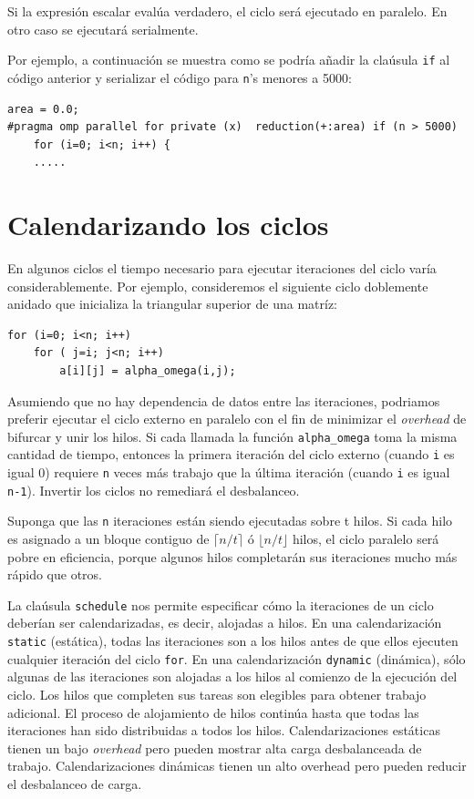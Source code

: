 \documentclass[12pt,letterpaper]{book}
\begin{document}
Si la expresión escalar evalúa verdadero, el ciclo será ejecutado en paralelo. En otro caso se ejecutará serialmente.

Por ejemplo, a continuación se muestra como se podría añadir la claúsula \texttt{if} al código anterior y serializar el código para \texttt{n}'s menores a 5000:

\begin{lstlisting}[style=C]
area = 0.0;
#pragma omp parallel for private (x)  reduction(+:area) if (n > 5000)
	for (i=0; i<n; i++) {
	.....
\end{lstlisting}


\section{Calendarizando los ciclos}
En algunos ciclos el tiempo necesario para ejecutar iteraciones del ciclo varía considerablemente. Por ejemplo, consideremos el siguiente ciclo doblemente anidado que inicializa la triangular superior de una matríz:

\begin{lstlisting}[style=C]
for (i=0; i<n; i++)
	for ( j=i; j<n; i++)
		a[i][j] = alpha_omega(i,j);
\end{lstlisting}

Asumiendo que no hay dependencia de datos entre las iteraciones, podriamos preferir ejecutar el ciclo externo en paralelo con el fin de minimizar el \textit{overhead} de bifurcar y unir  los hilos. Si cada llamada la función \texttt{alpha\_omega} toma la misma cantidad de tiempo, entonces la primera iteración del ciclo externo (cuando \texttt{i} es igual 0) requiere \texttt{n} veces más trabajo que la última iteración (cuando \texttt{i} es igual \texttt{n-1}). Invertir los ciclos no remediará el desbalanceo.

Suponga que las \texttt{n} iteraciones están siendo ejecutadas sobre t hilos. Si cada hilo es asignado a un bloque contiguo de $\lceil n/t \rceil$ ó $\lfloor n/t \rfloor$ hilos, el ciclo paralelo será pobre en eficiencia, porque algunos hilos completarán sus iteraciones mucho más rápido que otros.

La claúsula \texttt{schedule} nos permite especificar cómo la iteraciones de un ciclo deberían ser calendarizadas, es decir, alojadas a hilos. En una calendarización \texttt{static} (estática), todas las iteraciones son a los hilos antes de que ellos ejecuten cualquier iteración del ciclo \texttt{for}. En una calendarización \texttt{dynamic} (dinámica), sólo algunas de las iteraciones son alojadas a los hilos al comienzo de la ejecución del ciclo. Los hilos que completen sus tareas son elegibles para obtener trabajo adicional. El proceso de alojamiento de hilos continúa hasta que todas las iteraciones han sido distribuidas a todos los hilos. Calendarizaciones estáticas tienen un bajo \textit{overhead} pero pueden mostrar alta carga desbalanceada de trabajo. Calendarizaciones dinámicas tienen  un alto overhead pero pueden reducir el desbalanceo de carga.
\end{document}
